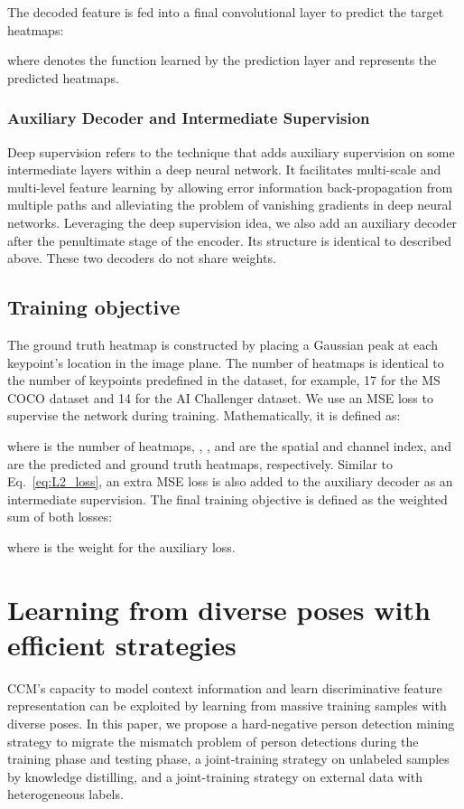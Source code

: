 \documentclass[twocolumn]{svjour3}          \smartqed  \usepackage{natbib}
\begin{document}
The decoded feature  is fed into a final  convolutional layer to predict the target heatmaps:

where  denotes the function learned by the prediction layer and  represents the predicted heatmaps.

\subsubsection{Auxiliary Decoder and Intermediate Supervision}
\label{subsubsec:auxdecoder}
Deep supervision \citep{lee2015deeply} refers to the technique that adds auxiliary supervision on some intermediate layers within a deep neural network. It facilitates multi-scale and multi-level feature learning by allowing error information back-propagation from multiple paths and alleviating the problem of vanishing gradients in deep neural networks. Leveraging the deep supervision idea, we also add an auxiliary decoder  after the penultimate stage of the encoder. Its structure is identical to  described above. These two decoders do not share weights.

\subsection{Training objective}
\label{subsec:objective}
The ground truth heatmap is constructed by placing a Gaussian peak at each keypoint's location in the image plane. The number of heatmaps is identical to the number of keypoints predefined in the dataset, for example, 17 for the MS COCO dataset \citep{lin2014microsoft} and 14 for the AI Challenger dataset. We use an MSE loss to supervise the network during training. Mathematically, it is defined as:

where  is the number of heatmaps, , , and  are the spatial and channel index,  and  are the predicted and ground truth heatmaps, respectively. Similar to Eq.~\eqref{eq:L2_loss}, an extra MSE loss  is also added to the auxiliary decoder as an intermediate supervision. The final training objective is defined as the weighted sum of both losses:

where  is the weight for the auxiliary loss.

\section{Learning from diverse poses with efficient strategies}
\label{sec:learningStrategies}
CCM's capacity to model context information and learn discriminative feature representation can be exploited by learning from massive training samples with diverse poses. In this paper, we propose a hard-negative person detection mining strategy to migrate the mismatch problem of person detections during the training phase and testing phase, a joint-training strategy on unlabeled samples by knowledge distilling, and a joint-training strategy on external data with heterogeneous labels.
\end{document}
